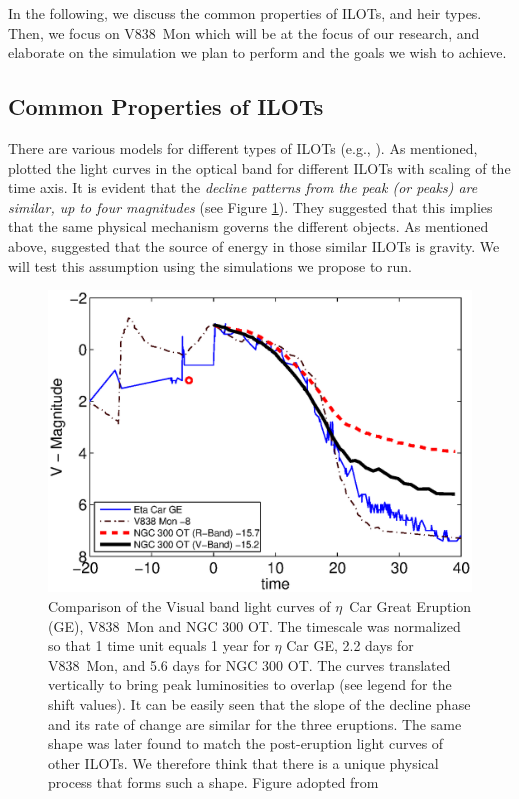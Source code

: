 \documentclass[a4paper,modern]{aastex62}
\begin{document}
In the following, we discuss the common properties of ILOTs, and heir types.
Then, we focus on V838~Mon which will be at the focus of our research, and elaborate on the simulation we plan to perform and the goals we wish to achieve.

\subsection{Common Properties of ILOTs}

There are various models for different types of ILOTs (e.g., \citealt{2006A&A...451..223T,2007Natur.447..458K,2007Natur.449E...1P,2009ApJ...699.1850B,2009ApJ...697L..49S,2010ApJ...709L..11K,2010A&A...516A.108M,2010MNRAS.408..181P,2011A&A...528A.114T,2011MNRAS.415.2020S,2011MNRAS.415.2009S,2011MNRAS.415..773S,2011ApJ...730..134K,2014MNRAS.443.1319K,2015A&A...580A..34K,2016ApJ...817...66K}).
As mentioned, \cite{2010ApJ...709L..11K} plotted the light curves in the optical band for different ILOTs with scaling of the time axis. 
It is evident that the \textit{decline patterns from the peak (or peaks) are similar, up to four magnitudes} (see Figure \ref{fig:0909.1909.TC1p2}).
They suggested that this implies that the same physical mechanism governs the different objects.
As mentioned above, \cite{2016RAA....16...99K} suggested that the source of energy in those similar ILOTs is gravity.
We will test this assumption using the simulations we propose to run.
\begin{figure}[t!]
\includegraphics[width=\linewidth]{TC1p2.eps}
\caption{Comparison of the Visual band light curves of $\eta$~Car Great Eruption (GE), V838~Mon and NGC 300 OT. The timescale was normalized so that 1 time unit equals 1 year for $\eta$ Car GE, 2.2 days for V838~Mon, and 5.6 days for NGC 300 OT.
The curves translated vertically to bring peak luminosities to overlap (see legend for the shift values). 
It can be easily seen that the slope of the decline phase and its rate of change are similar for the three eruptions.
The same shape was later found to match the post-eruption light curves of other ILOTs.
We therefore think that there is a unique physical process that forms such a shape.
Figure adopted from \cite{2010ApJ...709L..11K}}
\label{fig:0909.1909.TC1p2}
\end{figure}
\end{document}
